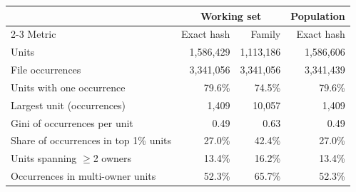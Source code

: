 \begin{tabular}{lrrr}
\toprule
 & \multicolumn{2}{c}{Working set} & Population \\
\cmidrule(lr){2-3}
Metric & Exact hash & Family & Exact hash \\
\midrule
Units & 1,586,429 & 1,113,186 & 1,586,606 \\
File occurrences & 3,341,056 & 3,341,056 & 3,341,439 \\
Units with one occurrence & 79.6\% & 74.5\% & 79.6\% \\
Largest unit (occurrences) & 1,409 & 10,057 & 1,409 \\
Gini of occurrences per unit & 0.49 & 0.63 & 0.49 \\
Share of occurrences in top 1\% units & 27.0\% & 42.4\% & 27.0\% \\
Units spanning $\geq$2 owners & 13.4\% & 16.2\% & 13.4\% \\
Occurrences in multi-owner units & 52.3\% & 65.7\% & 52.3\% \\
\bottomrule
\end{tabular}
